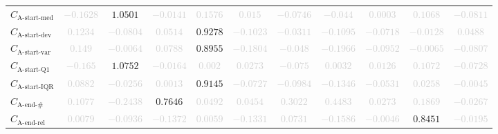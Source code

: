 \documentclass{standalone}
\newcommand{\startmedianname}{\text{A-start-med}}
\newcommand{\startmedian}{C_{\startmedianname}}
\newcommand{\startdevname}{\text{A-start-dev}}
\newcommand{\startdev}{C_{\startdevname}}
\newcommand{\startvarname}{\text{A-start-var}}
\newcommand{\startvar}{C_{\startvarname}}
\newcommand{\startqonename}{\text{A-start-Q1}}
\newcommand{\startqone}{C_{\startqonename}}
\newcommand{\startiqrname}{\text{A-start-IQR}}
\newcommand{\startiqr}{C_{\startiqrname}}
\newcommand{\lastactivitiesname}{\text{A-end-\#}}
\newcommand{\lastactivities}{C_{\lastactivitiesname}}
\newcommand{\lastactivitiesrelname}{\text{A-end-rel}}
\newcommand{\lastactivitiesrel}{C_{\lastactivitiesrelname}}
\begin{document}
\begin{tabular}{lcccccccccc}
$\startmedian$ & \textcolor{lightgray}{$-0.1628$} & $1.0501$ & \textcolor{lightgray}{$-0.0141$} & \textcolor{lightgray}{$0.1576$} & \textcolor{lightgray}{$0.015$} & \textcolor{lightgray}{$-0.0746$} & \textcolor{lightgray}{$-0.044$} & \textcolor{lightgray}{$0.0003$} & \textcolor{lightgray}{$0.1068$} & \textcolor{lightgray}{$-0.0811$} \\ 
$\startdev$ & \textcolor{lightgray}{$0.1234$} & \textcolor{lightgray}{$-0.0804$} & \textcolor{lightgray}{$0.0514$} & $0.9278$ & \textcolor{lightgray}{$-0.1023$} & \textcolor{lightgray}{$-0.0311$} & \textcolor{lightgray}{$-0.1095$} & \textcolor{lightgray}{$-0.0718$} & \textcolor{lightgray}{$-0.0128$} & \textcolor{lightgray}{$0.0488$} \\ 
$\startvar$ & \textcolor{lightgray}{$0.149$} & \textcolor{lightgray}{$-0.0064$} & \textcolor{lightgray}{$0.0788$} & $0.8955$ & \textcolor{lightgray}{$-0.1804$} & \textcolor{lightgray}{$-0.048$} & \textcolor{lightgray}{$-0.1966$} & \textcolor{lightgray}{$-0.0952$} & \textcolor{lightgray}{$-0.0065$} & \textcolor{lightgray}{$-0.0807$} \\ 
$\startqone$ & \textcolor{lightgray}{$-0.165$} & $1.0752$ & \textcolor{lightgray}{$-0.0164$} & \textcolor{lightgray}{$0.002$} & \textcolor{lightgray}{$0.0273$} & \textcolor{lightgray}{$-0.075$} & \textcolor{lightgray}{$0.0032$} & \textcolor{lightgray}{$0.0126$} & \textcolor{lightgray}{$0.1072$} & \textcolor{lightgray}{$-0.0728$} \\ 
$\startiqr$ & \textcolor{lightgray}{$0.0882$} & \textcolor{lightgray}{$-0.0256$} & \textcolor{lightgray}{$0.0013$} & $0.9145$ & \textcolor{lightgray}{$-0.0727$} & \textcolor{lightgray}{$-0.0984$} & \textcolor{lightgray}{$-0.1346$} & \textcolor{lightgray}{$-0.0531$} & \textcolor{lightgray}{$0.0258$} & \textcolor{lightgray}{$-0.0045$} \\ 
$\lastactivities$ & \textcolor{lightgray}{$0.1077$} & \textcolor{lightgray}{$-0.2438$} & $0.7646$ & \textcolor{lightgray}{$0.0492$} & \textcolor{lightgray}{$0.0454$} & \textcolor{lightgray}{$0.3022$} & \textcolor{lightgray}{$0.4483$} & \textcolor{lightgray}{$0.0273$} & \textcolor{lightgray}{$0.1869$} & \textcolor{lightgray}{$-0.0267$} \\ 
$\lastactivitiesrel$ & \textcolor{lightgray}{$0.0079$} & \textcolor{lightgray}{$-0.0936$} & \textcolor{lightgray}{$-0.1372$} & \textcolor{lightgray}{$0.0059$} & \textcolor{lightgray}{$-0.1331$} & \textcolor{lightgray}{$0.0731$} & \textcolor{lightgray}{$-0.1586$} & \textcolor{lightgray}{$-0.0046$} & $0.8451$ & \textcolor{lightgray}{$-0.0195$} \\ 

\end{tabular}
\end{document}
